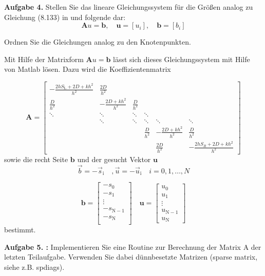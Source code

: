 \begin{mybox}
	\textbf{Aufgabe 4.} Stellen Sie das lineare Gleichungssystem für die Größen analog zu Gleichung (8.133) in \cite{Atkinson.2004} und folgende dar:
	\begin{equation}\label{eq:lgs}
		\mathbf{A} u = \mathbf{b},\quad \mathbf{u} = [u_i],\quad \mathbf{b} = [b_i]
	\end{equation}

	Ordnen Sie die Gleichungen analog zu den Knotenpunkten.
\end{mybox}


Mit Hilfe der Matrixform $\mathbf{A} u =\mathbf{ b} $ lässt sich dieses Gleichungssystem mit Hilfe von Matlab lösen. Dazu wird die Koeffizientenmatrix

\begin{equation}
\mathbf{A}=	\begin{bmatrix}
		-\frac{2hS_\mathrm{L}+2D+kh^2}{h^2} & \frac{2D}{h^2} & & &  &   \\
		\frac{D}{h^2} & - \frac{2D+kh^2}{h^2} & \frac{D}{h^2} &  &  & \\
	\ddots	&  \ddots &  \ddots &  \ddots &  &  \\
		& \ddots & \ddots & \ddots & \ddots  & \ddots \\
		&  &  & \frac{D}{h^2} & - \frac{2D+kh^2}{h^2} & \frac{D}{h^2} \\
		&  &  &  & \frac{2D}{h^2} & -\frac{2hS_R+2D+kh^2}{h^2}
	\end{bmatrix}
\end{equation}
sowie die recht Seite $\mathbf{b}$ und der gesucht Vektor $\mathbf{u}$
\begin{equation}
	\vec{b}=-\vec{s}_\mathrm{i}\quad,	\vec{u}=-\vec{u}_\mathrm{i} \quad i=0,1,\dots,N
\end{equation}

\begin{equation}
	\mathbf{b}=\begin{bmatrix}
	-	s_0 \\
	-	s_1 \\
		\vdots \\
	-	s_{\mathrm{N}-1} \\
	-	s_{\mathrm{N}} \\
	\end{bmatrix} \quad \mathbf{u}=\begin{bmatrix}
		u_0 \\
		u_1 \\
		\vdots \\
		u_{\mathrm{N}-1} \\
		u_\mathrm{N}
	\end{bmatrix}
\end{equation}
bestimmt.
\pagebreak
\begin{mybox}
	\textbf{Aufgabe 5. :} Implementieren Sie eine Routine zur Berechnung der Matrix A der letzten Teilaufgabe. Verwenden
	Sie dabei dünnbesetzte Matrizen (sparse matrix, siehe z.B. spdiags).
\end{mybox}

